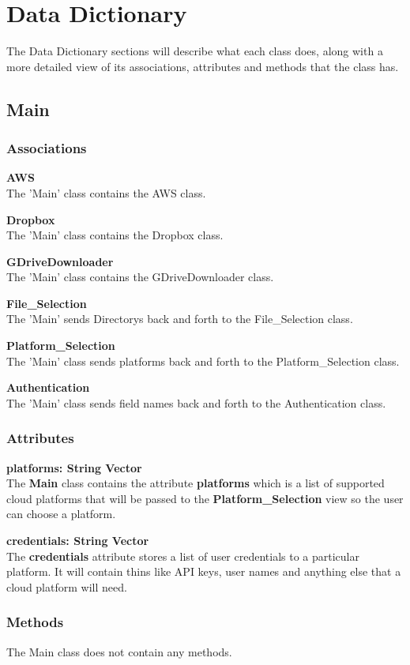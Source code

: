 \section{Data Dictionary}
The Data Dictionary sections will describe what each class does, along with a more detailed view of its
associations, attributes and methods that the class has.

\subsection{Main}

\subsubsection{Associations}
\textbf{AWS} \\
The 'Main' class contains the AWS class.

\textbf{Dropbox} \\
The 'Main' class contains the Dropbox class.

\textbf{GDriveDownloader} \\
The 'Main' class contains the GDriveDownloader class.

\textbf{File\_Selection} \\
The 'Main' sends Directorys back and forth to the File\_Selection class.

\textbf{Platform\_Selection} \\
The 'Main' class sends platforms back and forth to the Platform\_Selection class.

\textbf{Authentication} \\
The 'Main' class sends field names back and forth to the Authentication class.

\subsubsection{Attributes}
\textbf{platforms: String Vector} \\
The \textbf{Main} class contains the attribute \textbf{platforms} which is a list of
supported cloud platforms that will be passed to the \textbf{Platform\_Selection} view
so the user can choose a platform.

\textbf{credentials: String Vector} \\
The \textbf{credentials} attribute stores a list of user credentials to a particular
platform. It will contain thins like API keys, user names and anything else that a
cloud platform will need.

\subsubsection{Methods}
The Main class does not contain any methods.

